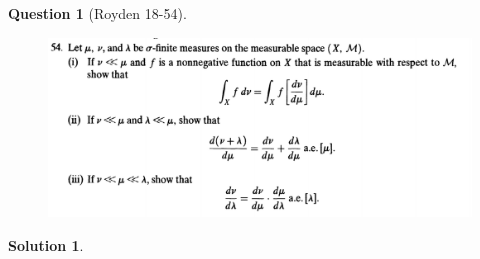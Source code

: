 \documentclass{article} %
\theoremstyle{quest}
\newtheorem*{question}{Question}
\newtheorem*{solution}{Solution}
\begin{document}
\newpage

\begin{question}[Royden 18-54]
\hfill
\begin{figure}[h!]
  \centering
    \includegraphics[width=1\textwidth]{rv-18-54.png}
\end{figure}
\end{question}
\begin{solution}

\end{solution}
\newpage
\end{document}
